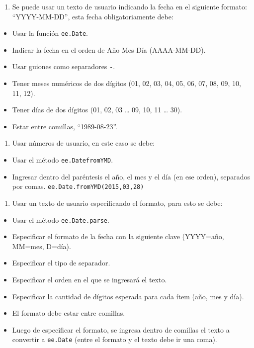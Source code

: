\documentclass[
  12pt,
  letterpaper,
  twoside]{book}
\providecommand{\tightlist}{%
  \setlength{\itemsep}{0pt}\setlength{\parskip}{0pt}}
\begin{document}
\begin{enumerate}
\def\labelenumi{\arabic{enumi}.}
\tightlist
\item
  Se puede usar un texto de usuario indicando la fecha en el siguiente formato: ``YYYY-MM-DD'', esta fecha obligatoriamente debe:
\end{enumerate}

\begin{itemize}
\tightlist
\item
  Usar la función \texttt{ee.Date}.
\item
  Indicar la fecha en el orden de Año Mes Día (AAAA-MM-DD).
\item
  Usar guiones como separadores \texttt{-}.
\item
  Tener meses numéricos de dos dígitos (01, 02, 03, 04, 05, 06, 07, 08, 09, 10, 11, 12).
\item
  Tener días de dos dígitos (01, 02, 03 \ldots{} 09, 10, 11 \ldots{} 30).
\item
  Estar entre comillas, ``1989-08-23''.
\end{itemize}

\begin{enumerate}
\def\labelenumi{\arabic{enumi}.}
\setcounter{enumi}{1}
\tightlist
\item
  Usar números de usuario, en este caso se debe:
\end{enumerate}

\begin{itemize}
\tightlist
\item
  Usar el método \texttt{ee.DatefromYMD}.
\item
  Ingresar dentro del paréntesis el año, el mes y el día (en ese orden), separados por comas. \texttt{ee.Date.fromYMD(2015,03,28)}
\end{itemize}

\begin{enumerate}
\def\labelenumi{\arabic{enumi}.}
\setcounter{enumi}{2}
\tightlist
\item
  Usar un texto de usuario especificando el formato, para esto se debe:
\end{enumerate}

\begin{itemize}
\tightlist
\item
  Usar el método \texttt{ee.Date.parse}.
\item
  Especificar el formato de la fecha con la siguiente clave (YYYY=año, MM=mes, D=día).
\item
  Especificar el tipo de separador.
\item
  Especificar el orden en el que se ingresará el texto.
\item
  Especificar la cantidad de dígitos esperada para cada ítem (año, mes y día).
\item
  El formato debe estar entre comillas.
\item
  Luego de especificar el formato, se ingresa dentro de comillas el texto a convertir a \texttt{ee.Date} (entre el formato y el texto debe ir una coma).
\end{itemize}
\end{document}
